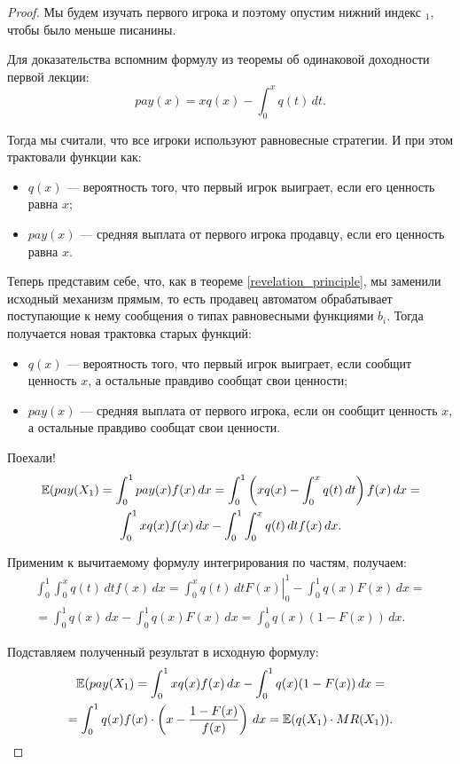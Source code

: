 \begin{proof}
Мы будем изучать первого игрока и поэтому опустим нижний индекс $ _1 $, чтобы было меньше писанины.

Для доказательства вспомним формулу из теоремы об одинаковой доходности первой лекции:
\begin{equation}
pay(x)=xq(x)-\int_{0}^{x}q(t) \, dt.
\end{equation}

Тогда мы считали, что все игроки используют равновесные стратегии. И при этом трактовали функции как:

\begin{itemize}
\item $ q(x) $ — вероятность того, что первый игрок выиграет, если его ценность равна $ x $;
\item $ pay(x) $ — средняя выплата от первого игрока продавцу, если его ценность равна $ x $.
\end{itemize}

Теперь представим себе, что, как в теореме \ref{revelation_principle}, мы заменили исходный механизм прямым, то есть продавец автоматом обрабатывает поступающие к нему сообщения о типах равновесными функциями $ b_{i} $. Тогда получается новая трактовка старых функций:

\begin{itemize}
\item $ q(x) $ — вероятность того, что первый игрок выиграет, если сообщит ценность $ x $, а остальные правдиво сообщат свои ценности;
\item $ pay(x) $ — средняя выплата от первого игрока, если он сообщит ценность $x$, а остальные правдиво сообщат свои ценности.
\end{itemize}

Поехали!
\begin{multline}
\operatorname{\mathbb{E}}(pay(X_{1})=\int_{0}^{1} pay(x)f(x) \, dx=\int_{0}^{1} \left( xq(x)-\int_{0}^{x}q(t) \, dt \right) f(x) \, dx=\\
\int_{0}^{1}xq(x)f(x) \, dx-\int_{0}^{1}\int_{0}^{x}q(t) \, dt f(x) \, dx.
\end{multline}

Применим к вычитаемому формулу интегрирования по частям, получаем:
\begin{multline}
\int_{0}^{1}\int_{0}^{x}q(t) \, dt f(x) \, dx=\left. \int_{0}^{x}q(t) \, dt F(x)\right|_{0}^{1}-\int_{0}^{1}q(x)F(x) \, dx=\\
=\int_{0}^{1} q(x) \, dx-\int_{0}^{1}q(x)F(x) \, dx=\int_{0}^{1} q(x)(1-F(x)) \, dx.
\end{multline}

Подставляем полученный результат в исходную формулу:
\begin{multline}
\operatorname{\mathbb{E}}(pay(X_{1})=\int_{0}^{1}xq(x)f(x) \, dx-\int_{0}^{1} q(x)(1-F(x)) \, dx=\\
=\int_{0}^{1}q(x)f(x)\cdot \left(x-\frac{1-F(x)}{f(x)} \right) \, dx=\operatorname{\mathbb{E}}(q(X_{1})\cdot MR(X_{1})).
\end{multline}
\end{proof}

